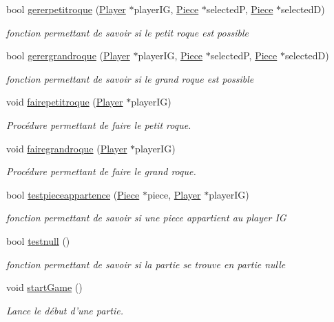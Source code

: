 \begin{DoxyCompactItemize}
bool \hyperlink{class_chess_a6206462cbbff396c4fa898d45660471b}{gererpetitroque} (\hyperlink{class_player}{Player} $\ast$player\-I\-G, \hyperlink{class_piece}{Piece} $\ast$selected\-P, \hyperlink{class_piece}{Piece} $\ast$selected\-D)
\begin{DoxyCompactList}\small\item\em fonction permettant de savoir si le petit roque est possible \end{DoxyCompactList}\item 
bool \hyperlink{class_chess_a37bce0d85e4d9e66dcc9845a440cd30d}{gerergrandroque} (\hyperlink{class_player}{Player} $\ast$player\-I\-G, \hyperlink{class_piece}{Piece} $\ast$selected\-P, \hyperlink{class_piece}{Piece} $\ast$selected\-D)
\begin{DoxyCompactList}\small\item\em fonction permettant de savoir si le grand roque est possible \end{DoxyCompactList}\item 
void \hyperlink{class_chess_ab92c6dd132e82810617bd3abc02feda0}{fairepetitroque} (\hyperlink{class_player}{Player} $\ast$player\-I\-G)
\begin{DoxyCompactList}\small\item\em Procédure permettant de faire le petit roque. \end{DoxyCompactList}\item 
void \hyperlink{class_chess_a65ef639fd19934036349c68e911ca71d}{fairegrandroque} (\hyperlink{class_player}{Player} $\ast$player\-I\-G)
\begin{DoxyCompactList}\small\item\em Procédure permettant de faire le grand roque. \end{DoxyCompactList}\item 
bool \hyperlink{class_chess_a50a49db321a3b0a7ce8c812b72ef0fe1}{testpieceappartence} (\hyperlink{class_piece}{Piece} $\ast$piece, \hyperlink{class_player}{Player} $\ast$player\-I\-G)
\begin{DoxyCompactList}\small\item\em fonction permettant de savoir si une piece appartient au player I\-G \end{DoxyCompactList}\item 
bool \hyperlink{class_chess_a6e538fe6848f15b72dfa95bd1aac4eec}{testnull} ()
\begin{DoxyCompactList}\small\item\em fonction permettant de savoir si la partie se trouve en partie nulle \end{DoxyCompactList}\item 
void \hyperlink{class_chess_aea92734ff5516066d5c1a690a78ea146}{start\-Game} ()
\begin{DoxyCompactList}\small\item\em Lance le début d'une partie. \end{DoxyCompactList}\end{DoxyCompactItemize}


